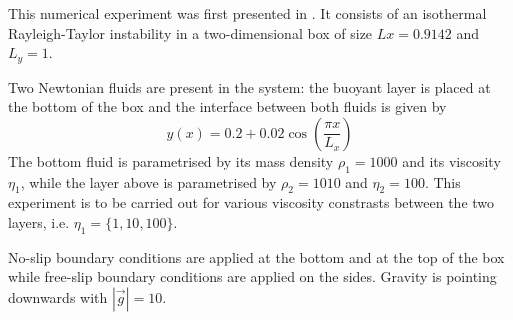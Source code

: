 

This numerical experiment was first presented in \cite{vaks97}.
It consists of an isothermal Rayleigh-Taylor instability in a two-dimensional box
of size $Lx=0.9142$ and $L_y=1$.

Two Newtonian fluids are present in the system: the buoyant layer is placed at the bottom of 
the box and the interface between both fluids is given by 
\begin{equation}
y(x)=0.2+0.02\cos \left( \frac{\pi x}{L_x}  \right)
\end{equation}
The bottom fluid is parametrised by its mass density $\rho_1=1000$ and its viscosity $\eta_1$, 
while the layer above is parametrised by $\rho_2=1010$ and $\eta_2=100$.
This experiment is to be carried out for various viscosity constrasts between the 
two layers, i.e. $\eta_1=\{1,10,100\}$.

No-slip boundary conditions are applied at the bottom and at the top of the box 
while free-slip boundary conditions are applied on the sides.
Gravity is pointing downwards with $|\vec{g}|=10$. 

